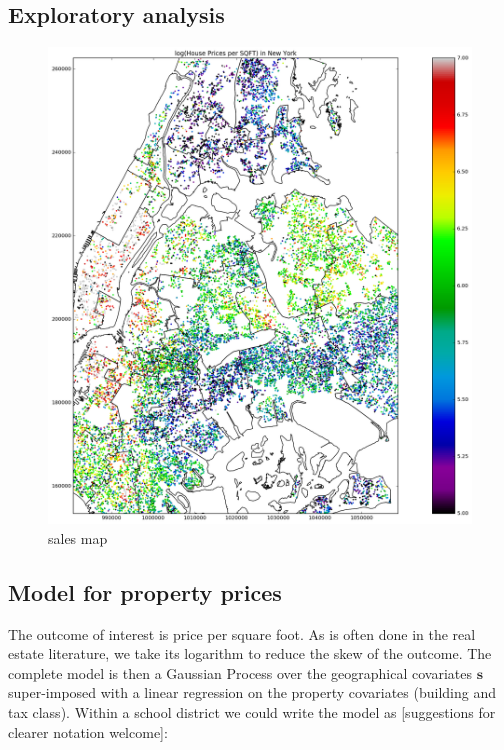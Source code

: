 \documentclass[letter]{article}
\makeatletter
\def\maxwidth{\ifdim\Gin@nat@width>\linewidth\linewidth
    \else\Gin@nat@width\fi}
\let\Oldincludegraphics\includegraphics
\renewcommand{\includegraphics}[1]{\Oldincludegraphics[width=.8\maxwidth]{#1}}
\newcommand{\svec}{\mathbold{s}}
\makeatother
\begin{document}
    	\subsection{Exploratory analysis}\label{exploratory-analysis}

\begin{figure}
\centering
\includegraphics{NYC/NYC_plots/NYC_sales.png}
\caption{sales map}
\end{figure}
    


    	\subsection{Model for property prices}\label{model-for-property-prices}

The outcome of interest is price per square foot. As is often done in
the real estate literature, we take its logarithm to reduce the skew of
the outcome. The complete model is then a Gaussian Process over the
geographical covariates \(\svec\) super-imposed with a linear regression
on the property covariates (building and tax class). Within a school
district we could write the model as {[}suggestions for clearer notation
welcome{]}:
\end{document}
